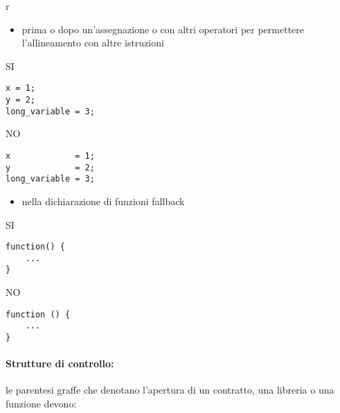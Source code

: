 r\documentclass[../ProcessiPrimari.tex]{subfiles}
\begin{document}
\begin{itemize}
\item prima o dopo un'assegnazione o con altri operatori per permettere l'allineamento con altre istruzioni 
\end{itemize}
\begin{center}{
\begin{minipage}{5cm}
{\begin{center}SI\end{center}}
\begin{Verbatim}[frame=single]
x = 1;
y = 2;
long_variable = 3;
\end{Verbatim}
\end{minipage}
\hfil
\begin{minipage}{5cm}
{\begin{center}NO\end{center}}
\begin{Verbatim}[frame=single]
x             = 1;
y             = 2;
long_variable = 3;
\end{Verbatim}
\end{minipage}
}
\end{center}

\begin{itemize}
\item nella dichiarazione di funzioni fallback
\end{itemize}
\begin{center}{
\begin{minipage}{5cm}
{\begin{center}SI\end{center}}
\begin{Verbatim}[frame=single]
function() {
    ...
}
\end{Verbatim}
\end{minipage}
\hfil
\begin{minipage}{5cm}
{\begin{center}NO\end{center}}
\begin{Verbatim}[frame=single]
function () {
    ...
}
\end{Verbatim}
\end{minipage}
}
\end{center}

\paragraph*{Strutture di controllo: }
le parentesi graffe che denotano l'apertura di un contratto, una libreria o una funzione devono:
\end{document}
